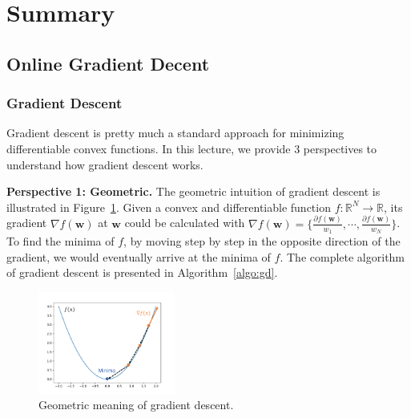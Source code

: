 \documentclass[11pt]{article}
\newcommand{\bw}{\boldsymbol{w}}
\begin{document}
\section{Summary}

\subsection{Online Gradient Decent}
\subsubsection{Gradient Descent}

Gradient descent is pretty much a standard approach for minimizing differentiable convex functions. In this lecture, we provide 3 perspectives to understand how gradient descent works.

\textbf{Perspective 1: Geometric.}
The geometric intuition of gradient descent is illustrated in Figure~\ref{fig:GD_geometric}. Given a convex and differentiable function $f:\mathbb{R}^N \rightarrow \mathbb{R}$, its gradient $\nabla f(\bw)$ at $\bw$ could be calculated with $\nabla f(\bw) = \{ \frac{\partial f(\bw)}{w_1}, \cdots, \frac{\partial f(\bw)}{w_N} \}$.
%
%
To find the minima of $f$, by moving step by step in the opposite direction of the gradient, we would eventually arrive at the minima of $f$. The complete algorithm of gradient descent is presented in Algorithm~\ref{algo:gd}.

\begin{figure}[t]
    \centering
    \includegraphics[width=0.4\textwidth]{Img/gradient_descent.pdf}
    \caption{Geometric meaning of gradient descent.
    }
    \label{fig:GD_geometric}
\end{figure}
\end{document}
